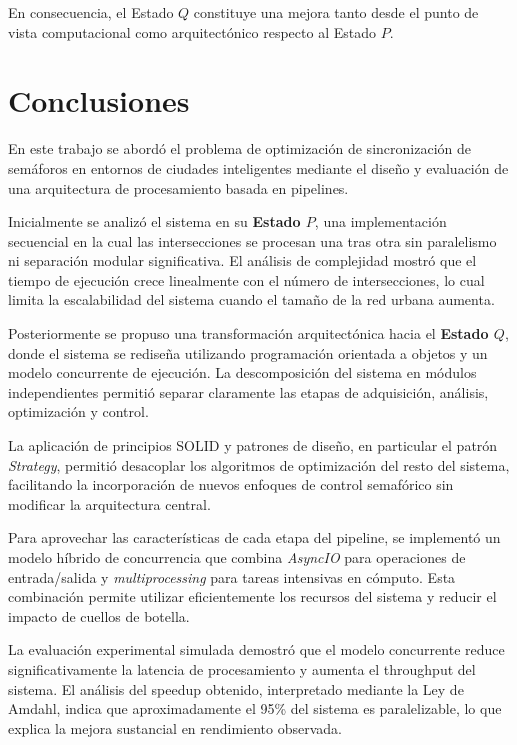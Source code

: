 \documentclass[12pt]{article}
\begin{document}
En consecuencia, el Estado \(Q\) constituye una mejora tanto desde el
punto de vista computacional como arquitectónico respecto al Estado \(P\).

\section{Conclusiones}

En este trabajo se abordó el problema de optimización de sincronización
de semáforos en entornos de ciudades inteligentes mediante el diseño
y evaluación de una arquitectura de procesamiento basada en pipelines.

Inicialmente se analizó el sistema en su \textbf{Estado \(P\)}, una
implementación secuencial en la cual las intersecciones se procesan
una tras otra sin paralelismo ni separación modular significativa.
El análisis de complejidad mostró que el tiempo de ejecución crece
linealmente con el número de intersecciones, lo cual limita la
escalabilidad del sistema cuando el tamaño de la red urbana aumenta.

Posteriormente se propuso una transformación arquitectónica hacia
el \textbf{Estado \(Q\)}, donde el sistema se rediseña utilizando
programación orientada a objetos y un modelo concurrente de ejecución.
La descomposición del sistema en módulos independientes permitió
separar claramente las etapas de adquisición, análisis, optimización
y control.

La aplicación de principios SOLID y patrones de diseño, en particular
el patrón \textit{Strategy}, permitió desacoplar los algoritmos de
optimización del resto del sistema, facilitando la incorporación de
nuevos enfoques de control semafórico sin modificar la arquitectura
central.

Para aprovechar las características de cada etapa del pipeline,
se implementó un modelo híbrido de concurrencia que combina
\textit{AsyncIO} para operaciones de entrada/salida y
\textit{multiprocessing} para tareas intensivas en cómputo.
Esta combinación permite utilizar eficientemente los recursos del
sistema y reducir el impacto de cuellos de botella.

La evaluación experimental simulada demostró que el modelo concurrente
reduce significativamente la latencia de procesamiento y aumenta el
throughput del sistema. El análisis del speedup obtenido, interpretado
mediante la Ley de Amdahl, indica que aproximadamente el 95\% del
sistema es paralelizable, lo que explica la mejora sustancial en
rendimiento observada.
\end{document}
